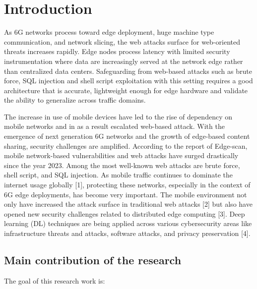 \section{Introduction}\label{sec:introduction}

As 6G networks process toward edge deployment, huge machine type communication, and network
slicing, the web attacks surface for web-oriented threats increases rapidly. Edge nodes process
latency with limited security instrumentation where data are increasingly served at the network
edge rather than centralized data centers. Safeguarding from web-based attacks such as brute force,
SQL injection and shell script exploitation with this setting requires a good architecture that is
accurate, lightweight enough for edge hardware and validate the ability to generalize across
traffic domains.

The increase in use of mobile devices have led to the rise of dependency on mobile networks and in
as a result escalated web-based attack. With the emergence of next generation 6G networks and the
growth of edge-based content sharing, security challenges are amplified. According to the report
of Edge-scan, mobile network-based vulnerabilities and web attacks have surged drastically since
the year 2023. Among the most well-known web attacks are brute force, shell script, and SQL
injection. As mobile traffic continues to dominate the internet usage globally [1], protecting
these networks, especially in the context of 6G edge deployments, has become very important. The
mobile environment not only have increased the attack surface in traditional web attacks [2] but
also have opened new security challenges related to distributed edge computing [3]. Deep learning
(DL) techniques are being applied across various cybersecurity areas like infrastructure threats
and attacks, software attacks, and privacy preservation [4].

\subsection{Main contribution of the research}\label{sec:contribution}

The goal of this research work is:

